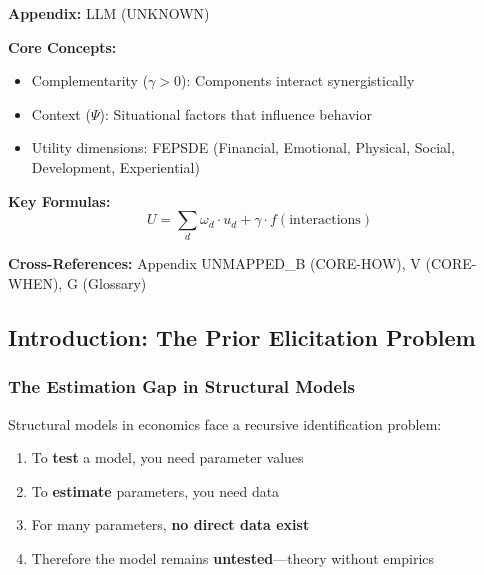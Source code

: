 \begin{tcolorbox}[colback=blue!5!white, colframe=blue!75!black,
    title=Quick Reference: Unknown]

\textbf{Appendix:} LLM (UNKNOWN)

\textbf{Core Concepts:}
\begin{itemize}[nosep]
\item Complementarity ($\gamma > 0$): Components interact synergistically
\item Context ($\Psi$): Situational factors that influence behavior
\item Utility dimensions: FEPSDE (Financial, Emotional, Physical, Social, Development, Experiential)
\end{itemize}

\textbf{Key Formulas:}
\begin{equation}
U = \sum_d \omega_d \cdot u_d + \gamma \cdot f(\text{interactions})
\end{equation}

\textbf{Cross-References:} Appendix UNMAPPED_B (CORE-HOW), V (CORE-WHEN), G (Glossary)
\end{tcolorbox}

\subsection{Introduction: The Prior Elicitation Problem}

\subsubsection{The Estimation Gap in Structural Models}

Structural models in economics face a recursive identification problem:

\begin{enumerate}
    \item To \textbf{test} a model, you need parameter values
    \item To \textbf{estimate} parameters, you need data
    \item For many parameters, \textbf{no direct data exist}
    \item Therefore the model remains \textbf{untested}---theory without empirics
\end{enumerate}

